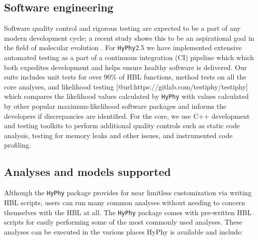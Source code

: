 \documentclass[nogrid]{MBE}%
\newcommand{\hyphy}{{\tt HyPhy}}
\begin{document}
\subsection{Software engineering }

Software quality control and rigorous testing are expected to be a part of any
modern development cycle; a recent study shows this to be an aspirational goal
in the field of molecular evolution \cite{darriba2018state}. For \hyphy{}2.5 we have
implemented extensive automated testing as a part of a continuous integration
(CI) pipeline which which both expedites development and helps ensure healthy
software is delivered.  Our suite includes unit tests for over 90\% of HBL
functions, method tests on all the core analyses, and likelihood testing
[@url:https://gitlab.com/testiphy/testiphy] which compares the likelihood values
calculated by \hyphy{} with values calculated by other popular
maximum-likelihood software packages and informs the developers if discrepancies
are identified. For the core, we use C++ development and testing toolkits to
perform additional quality controls such as static code analysis, testing for
memory leaks and other issues, and instrumented code profiling. 

\subsection{Analyses and models supported}

Although the \hyphy{} package provides for near limitless customization via
writing HBL scripts, users can run many common analyses without needing to
concern themselves with the HBL at all.  The \hyphy{}  package comes with
pre-written HBL scripts for easily performing some of the most commonly used
analyses.  These analyses can be executed in the various places HyPhy is
available and include:  
  
\end{document}
